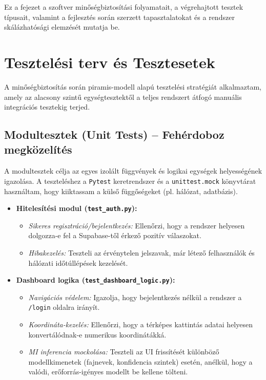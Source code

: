 \documentclass[
	parspace, %
]{elteikthesis}[2024/04/26]
\begin{document}
Ez a fejezet a szoftver minőségbiztosítási folyamatait, a végrehajtott tesztek típusait, valamint a fejlesztés során szerzett tapasztalatokat és a rendszer skálázhatósági elemzését mutatja be.

\section{Tesztelési terv és Tesztesetek}
A minőségbiztosítás során piramis-modell alapú tesztelési stratégiát alkalmaztam, amely az alacsony szintű egységtesztektől a teljes rendszert átfogó manuális integrációs tesztekig terjed.

\subsection{Modultesztek (Unit Tests) -- Fehérdoboz megközelítés}
A modultesztek célja az egyes izolált függvények és logikai egységek helyességének igazolása. A teszteléshez a \texttt{Pytest} keretrendszer és a \texttt{unittest.mock} könyvtárat használtam, hogy kiiktassam a külső függőségeket (pl. hálózat, adatbázis).

\begin{itemize}
    \item \textbf{Hitelesítési modul (\texttt{test\_auth.py}):}
    \begin{itemize}
        \item \textit{Sikeres regisztráció/bejelentkezés:} Ellenőrzi, hogy a rendszer helyesen dolgozza-e fel a Supabase-től érkező pozitív válaszokat.
        \item \textit{Hibakezelés:} Teszteli az érvénytelen jelszavak, már létező felhasználók és hálózati időtúllépések kezelését.
    \end{itemize}
    \item \textbf{Dashboard logika (\texttt{test\_dashboard\_logic.py}):}
    \begin{itemize}
        \item \textit{Navigációs védelem:} Igazolja, hogy bejelentkezés nélkül a rendszer a \texttt{/login} oldalra irányít.
        \item \textit{Koordináta-kezelés:} Ellenőrzi, hogy a térképes kattintás adatai helyesen konvertálódnak-e numerikus koordinátákká.
        \item \textit{MI inferencia mockolása:} Teszteli az UI frissítését különböző modellkimenetek (fajnevek, konfidencia szintek) esetén, anélkül, hogy a valódi, erőforrás-igényes modellt be kellene tölteni.
    \end{itemize}
\end{itemize}
\end{document}

